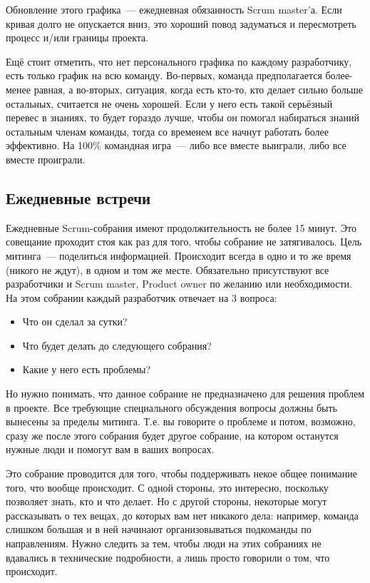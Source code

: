 \documentclass{../../text-style}
\begin{document}
Обновление этого графика~--- ежедневная обязанность Scrum master’а. Если кривая долго не опускается вниз, это хороший повод задуматься и пересмотреть процесс и/или границы проекта.

Ещё стоит отметить, что нет персонального графика по каждому разработчику, есть только график на всю команду. Во-первых, команда предполагается более-менее равная, а во-вторых, ситуация, когда есть кто-то, кто делает сильно больше остальных, считается не очень хорошей. Если у него есть такой серьёзный перевес в знаниях, то будет гораздо лучше, чтобы он помогал набираться знаний остальным членам команды, тогда со временем все начнут работать более эффективно. На 100\% командная игра~--- либо все вместе выиграли, либо все вместе проиграли.

\subsection{Ежедневные встречи}

Ежедневные Scrum-собрания имеют продолжительность не более 15 минут. Это совещание проходит стоя как раз для того, чтобы собрание не затягивалось. Цель митинга~--- поделиться информацией. Происходит всегда в одно и то же время (никого не ждут), в одном и том же месте. Обязательно присутствуют все разработчики и Scrum master, Product owner по желанию или необходимости. На этом собрании каждый разработчик отвечает на 3 вопроса:

\begin{itemize}
    \item Что он сделал за сутки? 
    \item Что будет делать до следующего собрания?
    \item Какие у него есть проблемы? 
\end{itemize}

Но нужно понимать, что данное собрание не предназначено для решения проблем в проекте. Все требующие специального обсуждения вопросы должны быть вынесены за пределы митинга. Т.е. вы говорите о проблеме и потом, возможно, сразу же после этого собрания будет другое собрание, на котором останутся нужные люди и помогут вам в ваших вопросах.

Это собрание проводится для того, чтобы поддерживать некое общее понимание того, что вообще происходит. С одной стороны, это интересно, поскольку позволяет знать, кто и что делает. Но с другой стороны, некоторые могут рассказывать о тех вещах, до которых вам нет никакого дела: например, команда слишком большая и в ней начинают организовываться подкоманды по направлениям. Нужно следить за тем, чтобы люди на этих собраниях не вдавались в технические подробности, а лишь просто говорили о том, что происходит.
\end{document}
